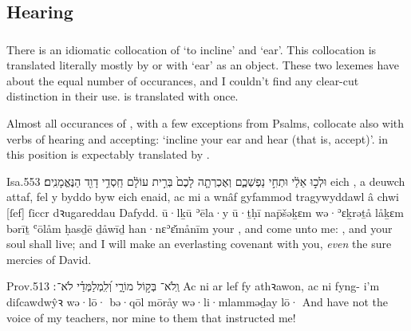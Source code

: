 \subsection{Hearing}

\subsubsection{}

\subsubsection{}


\begin{paper}
	There is an idiomatic collocation of  ‘to incline’ and  ‘ear’. This collocation is translated literally mostly by  or  with  ‘ear’ as an object. These two lexemes have about the equal number of occurances, and I couldn’t find any clear-cut distinction in their use.  is translated with  once.

	Almost all occurances of , with a few exceptions from Psalms, collocate also with verbs of hearing and accepting: ‘incline your ear and hear (that is, accept)’.  in this position is expectably translated by .
\end{paper}

\begin{example}{Isa.}{55}{3}{}{}
	\quoling
	{  וּלְכ֣וּ אֵלַ֔י  וּתְחִ֣י נַפְשְׁכֶ֑ם וְאֶכְרְתָ֤ה לָכֶם֙ בְּרִ֣ית עוֹלָ֔ם חַֽסְדֵ֥י דָוִ֖ד הַנֶּאֱמָנִֽים׃}
	{ eich , a deuwch attaf,  fel y byddo byw eich enaid, ac mi a wnâf gyfammod tragywyddawl â chwi [ſef] ſiccr dꝛugareddau Dafydd.}
	{  ū·lḵū ʾēla·y  ū·ṯḥī nap̄šəḵɛm wə·ʾɛḵrəṯå låḵɛm bərīṯ ʿōlåm ḥasḏē ḏåwīḏ han·nɛʾɛ̆månīm}
	{ your , and come unto me: , and your soul shall live; and I will make an everlasting covenant with you, \textit{even} the sure mercies of David.}
\end{example}

\begin{example}{Prov.}{5}{13}{}{}
	\quoling
	{וְֽלֹא־ בְּק֣וֹל מוֹרָ֑י וְ֝לִֽמְלַמְּדַ֗י לֹא־ ׃}
	{Ac ni  ar lef fy athꝛawon, ac ni  fyng- i’m diſcawdwŷꝛ}
	{wə·lō· bə·qōl mōråy wə·li·mlamməḏay lō· }
	{And have not  the voice of my teachers, nor  mine  to them that instructed me!}
\end{example}



